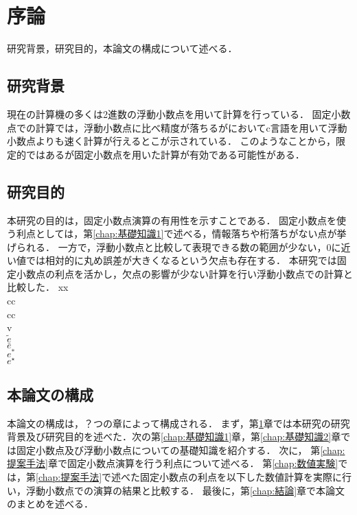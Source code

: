 \chapter{序論}
\label{chap:序論}
研究背景，研究目的，本論文の構成について述べる．
\begin{comment}
    目標規定：
    この修士論文は，固定小数点演算が浮動小数点演算に比べ精度の高い計算を行える場合があることを示すために書く．
\end{comment}
\section{研究背景}
現在の計算機の多くは2進数の浮動小数点を用いて計算を行っている．
固定小数点での計算では，浮動小数点に比べ精度が落ちるが\cite{IJERTV12IS010134}においてc言語を用いて浮動小数点よりも速く計算が行えるとこが示されている．
このようなことから，限定的ではあるが固定小数点を用いた計算が有効である可能性がある．

\section{研究目的}
本研究の目的は，固定小数点演算の有用性を示すことである．
固定小数点を使う利点としては，第\ref{chap:基礎知識1}で述べる，情報落ちや桁落ちがない点が挙げられる．
一方で，浮動小数点と比較して表現できる数の範囲が少ない，$0$に近い値では相対的に丸め誤差が大きくなるという欠点も存在する．
本研究では固定小数点の利点を活かし，欠点の影響が少ない計算を行い浮動小数点での計算と比較した．
xx\\
cc \\
cc\\
v\\
$\tilde{e} $\\
$\bar{e}$\\
$e^{\ast}$\\
$e^{\star}$\\
\section{本論文の構成}
本論文の構成は，？つの章によって構成される．
まず，第\ref{chap:序論}章では本研究の研究背景及び研究目的を述べた．次の第\ref{chap:基礎知識1}章，第\ref{chap:基礎知識2}章では固定小数点及び浮動小数点についての基礎知識を紹介する．
次に， 第\ref{chap:提案手法}章で固定小数点演算を行う利点について述べる．
第\ref{chap:数値実験}では，第\ref{chap:提案手法}で述べた固定小数点の利点を以下した数値計算を実際に行い，浮動小数点での演算の結果と比較する．
最後に，第\ref{chap:結論}章で本論文のまとめを述べる．
